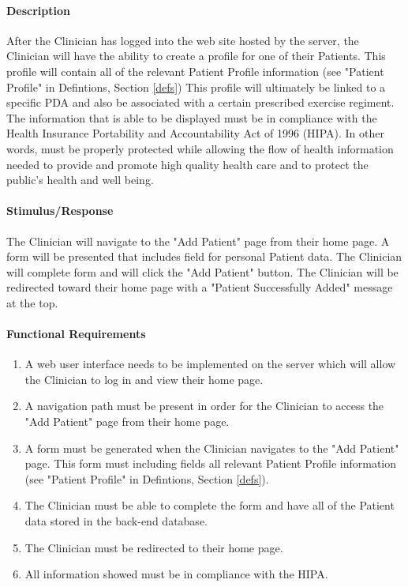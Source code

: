 \documentclass{article}
\begin{document}
\paragraph {Description}
After the Clinician has logged into the web site hosted by the server, the Clinician will have the ability to create a profile for one of their Patients. This profile will contain all of the relevant Patient Profile information (see "Patient Profile" in Defintions, Section \ref{defs}) This profile will ultimately be linked to a specific PDA and also be associated with a certain prescribed exercise regiment. The information that is able to be displayed must be in compliance with the Health Insurance Portability and Accountability Act of 1996 (HIPA). In other words, must be properly protected while allowing the flow of health information needed to provide and promote high quality health care and to protect the public's health and well being.

\paragraph {Stimulus/Response}
The Clinician will navigate to the "Add Patient" page from their home page. A form will be presented that includes field for personal Patient data. The Clinician will complete form and will click the "Add Patient" button. The Clinician will be redirected toward their home page with a "Patient Successfully Added" message at the top.

\paragraph {Functional Requirements}
\begin{enumerate}
\item A web user interface needs to be implemented on the server which will allow the Clinician to log in and view their home page.
\item A navigation path must be present in order for the Clinician to access the "Add Patient" page from their home page. 
\item A form must be generated when the Clinician navigates to the "Add Patient" page. This form must including fields all relevant Patient Profile information (see "Patient Profile" in Defintions, Section \ref{defs}).
\item The Clinician must be able to complete the form and have all of the Patient data stored in the back-end database. 
\item The Clinician must be redirected to their home page. 
\item All information showed must be in compliance with the HIPA.
\end{enumerate}
\end{document}
